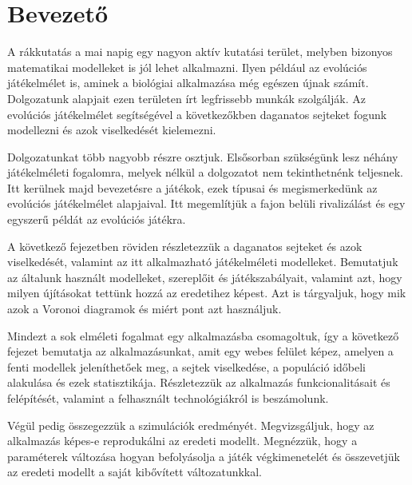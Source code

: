 \chapter{Bevezető}

A rákkutatás a mai napig egy nagyon aktív kutatási terület, melyben bizonyos matematikai modelleket is jól lehet alkalmazni. Ilyen például az evolúciós játékelmélet is, aminek a biológiai alkalmazása még egészen újnak számít. Dolgozatunk alapjait ezen területen írt legfrissebb munkák szolgálják. Az evolúciós játékelmélet segítségével a következőkben daganatos sejteket fogunk  modellezni és azok viselkedését kielemezni.

Dolgozatunkat több nagyobb részre osztjuk. Elsősorban szükségünk lesz néhány játékelméleti fogalomra, melyek nélkül a dolgozatot nem tekinthetnénk teljesnek. Itt kerülnek majd bevezetésre a játékok, ezek típusai és megismerkedünk az evolúciós játékelmélet alapjaival. Itt megemlítjük a fajon belüli rivalizálást és egy egyszerű példát az evolúciós játékra.

A következő fejezetben röviden részletezzük a daganatos sejteket és azok viselkedését, valamint az itt alkalmazható játékelméleti modelleket. Bemutatjuk az általunk használt modelleket, szereplőit és játékszabályait, valamint azt, hogy milyen újításokat tettünk hozzá az eredetihez képest. Azt is tárgyaljuk, hogy mik azok a Voronoi diagramok és miért pont azt használjuk.

Mindezt a sok elméleti fogalmat egy alkalmazásba csomagoltuk, így a következő fejezet bemutatja az alkalmazásunkat, amit egy webes felület képez, amelyen a fenti modellek jeleníthetőek meg, a sejtek viselkedése, a populáció időbeli alakulása és ezek statisztikája. Részletezzük az alkalmazás funkcionalitásait és felépítését, valamint a felhasznált technológiákról is beszámolunk.

Végül pedig összegezzük a szimulációk eredményét. Megvizsgáljuk, hogy az alkalmazás képes-e reprodukálni az eredeti modellt. Megnézzük, hogy a paraméterek változása hogyan befolyásolja a játék végkimenetelét és összevetjük az eredeti modellt a saját kibővített változatunkkal.